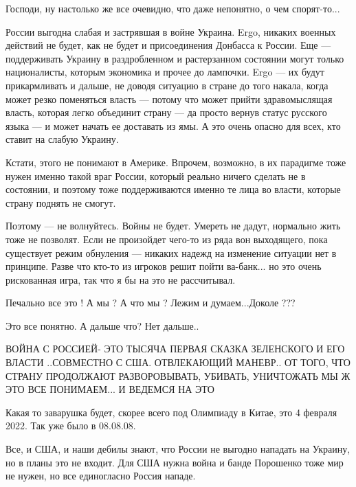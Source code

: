 \begin{itemize}

Господи, ну настолько же все очевидно, что даже непонятно, о чем спорят-то...

России выгодна слабая и застрявшая в войне Украина. Ergo, никаких военных
действий не будет, как не будет и присоединения Донбасса к России. Еще —
поддерживать Украину в раздробленном и растерзанном состоянии могут только
националисты, которым экономика и прочее до лампочки. Ergo — их будут
прикармливать и дальше, не доводя ситуацию в стране до того накала, когда может
резко поменяться власть — потому что может прийти здравомыслящая власть,
которая легко объединит страну — да просто вернув статус русского языка — и
может начать ее доставать из ямы. А это очень опасно для всех, кто ставит на
слабую Украину.

Кстати, этого не понимают в Америке. Впрочем, возможно, в их парадигме тоже
нужен именно такой враг России, который реально ничего сделать не в состоянии,
и поэтому тоже поддерживаются именно те лица во власти, которые страну поднять
не смогут.

Поэтому — не волнуйтесь. Войны не будет. Умереть не дадут, нормально жить тоже
не позволят. Если не произойдет чего-то из ряда вон выходящего, пока существует
режим обнуления — никаких надежд на изменение ситуации нет в принципе. Разве
что кто-то из игроков решит пойти ва-банк... но это очень рискованная игра, так
что я бы на это не рассчитывал.


Печально все это ! А мы ? А что мы ? Лежим и думаем...Доколе ???

Это все понятно. А дальше что? Нет дальше..


ВОЙНА С РОССИЕЙ- ЭТО ТЫСЯЧА ПЕРВАЯ СКАЗКА ЗЕЛЕНСКОГО И ЕГО ВЛАСТИ ..СОВМЕСТНО С
США. ОТВЛЕКАЮЩИЙ МАНЕВР.. ОТ ТОГО, ЧТО СТРАНУ ПРОДОЛЖАЮТ РАЗВОРОВЫВАТЬ, УБИВАТЬ,
УНИЧТОЖАТЬ МЫ Ж ЭТО ВСЕ ПОНИМАЕМ... И ВЕДЕМСЯ НА ЭТО



Какая то заварушка будет, скорее всего под Олимпиаду в Китае, это 4 февраля
2022. Так уже было в 08.08.08.



Все, и США, и наши дебилы знают, что России не выгодно нападать на Украину,
но в планы это не входит. Для США нужна война и банде Порошенко тоже мир не
нужен, но все единогласно Россия нападе.



\end{itemize}

